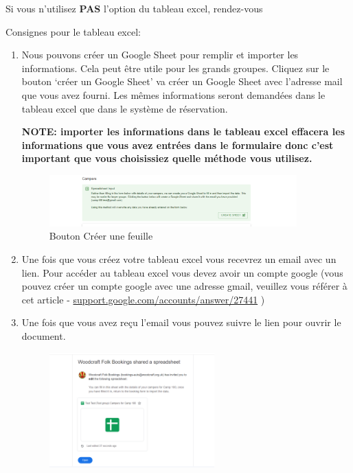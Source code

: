 \documentclass[a4paper, 11pt]{report}
\begin{document}
\begin{enumerate}
    Si vous n'utilisez \textbf{PAS} l'option du tableau excel, rendez-vous 

    Consignes pour le tableau excel: 
    \begin{enumerate}
        \item Nous pouvons cr\'eer un Google Sheet pour remplir et importer les informations. Cela peut \^etre utile pour les grands groupes. Cliquez sur le bouton `cr\'eer un Google Sheet' va cr\'eer un Google Sheet avec l'adresse mail que vous avez fourni. Les m\^emes informations seront demand\'ees dans le tableau excel que dans le syst\`eme de r\'eservation.
        
        \textbf{NOTE: importer les informations dans le tableau excel effacera les informations que vous avez entr\'ees dans le formulaire donc c'est important que vous choisissiez quelle m\'ethode vous utilisez.}
        \begin{figure}[H]
            \centering
            \includegraphics[width=0.9\textwidth]{assets/2-spreadsheet-option.png}
            \caption{Bouton Cr\'eer une feuille}
        \end{figure}
        \item Une fois que vous cr\'eez votre tableau excel vous recevrez un email avec un lien. Pour acc\'eder au tableau excel vous devez avoir un compte google (vous pouvez cr\'eer un compte google avec une adresse gmail, veuillez vous r\'ef\'erer \`a cet article - \href{https://support.google.com/accounts/answer/27441?hl=fr}{support.google.com/accounts/answer/27441} ) 
        \item Une fois que vous avez reçu l'email vous pouvez suivre le lien pour ouvrir le document.
         \begin{figure}[H]
            \centering
            \includegraphics[width=0.6\textwidth]{assets/2-spreadsheet-email.png}

\end{figure}
\end{enumerate}
\end{enumerate}
\end{document}
